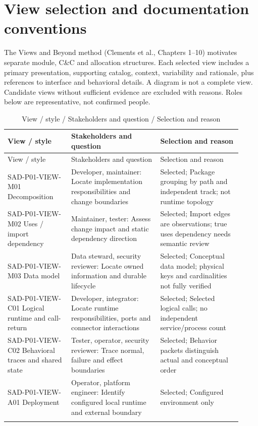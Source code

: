 \documentclass[10pt,letterpaper]{article}
\begin{document}
\section{View selection and documentation conventions}
The Views and Beyond method (Clements et al., Chapters 1--10) motivates separate module, C\&C and allocation structures. Each selected view includes a primary presentation, supporting catalog, context, variability and rationale, plus references to interface and behavioral details. A diagram is not a complete view. Candidate views without sufficient evidence are excluded with reasons. Roles below are representative, not confirmed people.
\begin{longtable}{@{}>{\raggedright\arraybackslash}p{0.25\linewidth}>{\raggedright\arraybackslash}p{0.35\linewidth}>{\raggedright\arraybackslash}p{0.32\linewidth}@{}}
\caption{View / style / Stakeholders and question / Selection and reason}\\
\toprule View / style & Stakeholders and question & Selection and reason\\\midrule\endfirsthead
\toprule View / style & Stakeholders and question & Selection and reason\\\midrule\endhead
SAD-P01-VIEW-M01 Decomposition & Developer, maintainer: Locate implementation responsibilities and change boundaries & Selected; Package grouping by path and independent track; not runtime topology\\\addlinespace
SAD-P01-VIEW-M02 Uses / import dependency & Maintainer, tester: Assess change impact and static dependency direction & Selected; Import edges are observations; true uses dependency needs semantic review\\\addlinespace
SAD-P01-VIEW-M03 Data model & Data steward, security reviewer: Locate owned information and durable lifecycle & Selected; Conceptual data model; physical keys and cardinalities not fully verified\\\addlinespace
SAD-P01-VIEW-C01 Logical runtime and call-return & Developer, integrator: Locate runtime responsibilities, ports and connector interactions & Selected; Selected logical calls; no independent service/process count\\\addlinespace
SAD-P01-VIEW-C02 Behavioral traces and shared state & Tester, operator, security reviewer: Trace normal, failure and effect boundaries & Selected; Behavior packets distinguish actual and conceptual order\\\addlinespace
SAD-P01-VIEW-A01 Deployment & Operator, platform engineer: Identify configured local runtime and external boundary & Selected; Configured environment only\\\addlinespace

\end{longtable}
\end{document}

